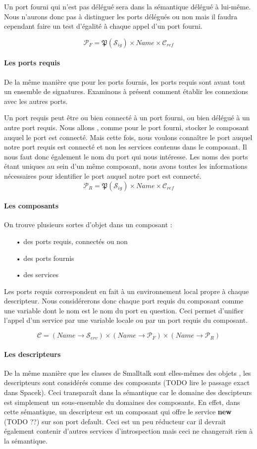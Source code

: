 \documentclass[11pt,a4paper,fleqn]{report}
\newcommand{\C}{\mathcal{C}}
\newcommand{\Cref}{\mathcal{C}_{ref}}
\newcommand{\PR}{\mathcal{P}_R}
\newcommand{\PF}{\mathcal{P}_F}
\newcommand{\Sig}{\mathcal{S}_{ig}}
\newcommand{\Serv}{\mathcal{S}_{erv}}
\begin{document}
Un port fourni qui n'est pas délégué sera dans la sémantique délégué à lui-même. Nous n'aurons donc pas à distinguer les ports délégués ou non mais il faudra cependant faire un test d'égalité à chaque appel d'un port fourni.

\[\PF = \mathfrak{P}(\Sig)\times Name \times \Cref\]

\paragraph{Les ports requis} 
De la même manière que pour les ports fournis, les ports requis sont avant tout un ensemble de signatures. Examinons à présent comment établir les connexions avec les autres ports.

Un port requis peut être ou bien connecté à un port fourni, ou bien délégué à un autre port requis. Nous allons , comme pour le port fourni, stocker le composant auquel le port est connecté. Mais cette fois, nous voulons connaître le port auquel notre port requis est connecté et non les services contenus dans le composant. Il nous faut donc également le nom du port qui nous intéresse. Les noms des ports étant uniques au sein d'un même composant, nous avons toutes les informations nécessaires pour identifier le port auquel notre port est connecté.
\[\PR = \mathfrak{P}(\Sig) \times Name \times \Cref\]

\paragraph{Les composants}
On trouve plusieurs sortes d'objet dans un composant : 
\begin{itemize}
\item[•] des ports requis, connectés ou non
\item[•] des ports fournis
\item[•] des services
\end{itemize}

Les ports requis correspondent en fait à un environnement local propre à chaque descripteur. Nous considérerons donc chaque port requis du composant comme une variable dont le nom est le nom du port en question. Ceci permet d'unifier l'appel d'un service par une variable locale ou par un port requis du composant.

\[\C=(Name \rightarrow \Serv) \times (Name \rightarrow \PF)  \times (Name \rightarrow \PR)\]



\paragraph{Les descripteurs}
De la même manière que les classes de Smalltalk sont elles-mêmes des objets \cite{Cla97}, les descripteurs sont considérés comme des composants  (TODO lire le passage exact dans Spacek). Ceci transparaît dans la sémantique car le domaine des descipteurs est simplement un sous-ensemble du domaines des composants. En effet, dans cette sémantique, un descripteur est un composant qui offre le service \textbf{new} (TODO ??) sur son port \textsf{default}. Ceci est un peu réducteur car il devrait également contenir d'autres services d'introspection mais ceci ne changerait rien à la sémantique. 
\end{document}
